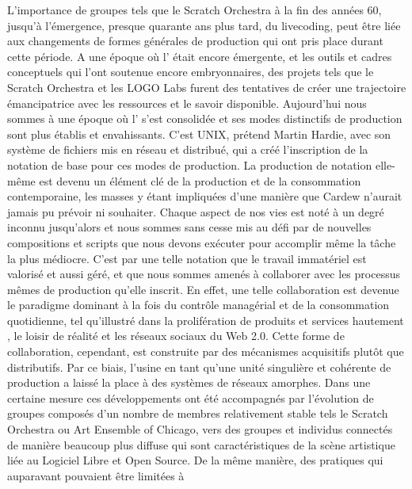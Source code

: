 {L'importance de groupes tels que le Scratch Orchestra \`a la fin des
ann\'ees 60, jusqu'\`a l'\'emergence, presque quarante ans plus tard,
du livecoding, peut \^etre li\'ee aux changements de formes
g\'en\'erales de production qui ont pris place durant cette p\'eriode.
A une \'epoque o\`u l' \'etait encore
\'emergente, et les outils et cadres conceptuels qui l'ont soutenue
encore embryonnaires, des projets tels que le Scratch Orchestra et les
LOGO Labs furent des tentatives de cr\'eer une trajectoire
\'emancipatrice avec les ressources et le savoir disponible.
Aujourd'hui nous sommes \`a une \'epoque o\`u l' s'est consolid\'ee et ses modes distinctifs de
production sont plus \'etablis et envahissants. C'est UNIX, pr\'etend
Martin Hardie, avec son syst\`eme de fichiers mis en r\'eseau et distribu\'e, qui a cr\'e\'e l'inscription de la notation de base pour ces modes de
production. La production de notation elle{}-m\^eme est devenu un
\'el\'ement cl\'e de la production et de la consommation contemporaine,
les masses y \'etant impliqu\'ees d'une mani\`ere que Cardew n'aurait
jamais pu pr\'evoir ni souhaiter. Chaque aspect de nos vies est not\'e
\`a un degr\'e inconnu jusqu'alors et nous sommes sans cesse mis au
d\'efi par de nouvelles compositions et scripts que nous devons
ex\'ecuter pour accomplir m\^eme la t\^ache la plus m\'ediocre. C'est
par une telle notation que le travail immat\'eriel est valoris\'e et
aussi g\'er\'e, et que nous sommes amen\'es \`a collaborer avec les
processus m\^emes de production qu'elle inscrit. En effet, une telle
collaboration est devenue le paradigme dominant \`a la fois du
contr\^ole manag\'erial et de la consommation quotidienne, tel
qu'illustr\'e dans la prolif\'eration de produits et services hautement
, le loisir de r\'ealit\'e et les r\'eseaux sociaux du
Web 2.0. Cette forme de collaboration, cependant, est construite par
des m\'ecanismes acquisitifs plut\^ot que distributifs. Par ce biais,
l'usine en tant qu'une unit\'e singuli\`ere et coh\'erente de
production a laiss\'e la place \`a des syst\`emes de r\'eseaux
amorphes. Dans une certaine mesure ces d\'eveloppements ont \'et\'e
accompagn\'es par l'\'evolution de groupes compos\'es d'un nombre de
membres relativement stable tels le Scratch Orchestra ou Art Ensemble
of Chicago, vers des groupes et individus connect\'es de mani\`ere
beaucoup plus diffuse qui sont caract\'eristiques de la sc\`ene
artistique li\'ee au Logiciel Libre et Open Source. De la m\^eme
mani\`ere, des pratiques qui auparavant pouvaient \^etre limit\'ees \`a
}
